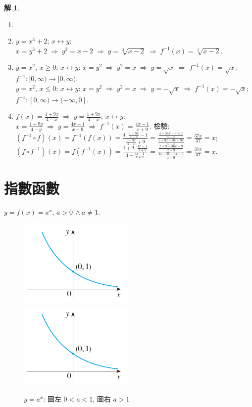 \documentclass[12pt,a4paper]{extarticle}
\newcommand{\ds}{\displaystyle}
\newcommand{\ie}{\;\Longrightarrow\;}
\theoremstyle{definition}
\newtheorem*{sol}{解}
\begin{document}
\begin{sol} 
  \begin{enumerate}\setlength\itemsep{0em}
    \item[]
    \item $y = x^3 + 2$; $x\longleftrightarrow y$: $x = y^3 + 2 \ie y^3 = x - 2 \ie y = \sqrt[3]{x - 2} \ie f^{-1}(x) = \sqrt[3]{x - 2}$.  
    \item $y = x^2$, $x\geqslant 0$;  $x\longleftrightarrow y$: $x = y^2 \ie y^2 = x \ie y = \sqrt{x} \ie f^{-1}(x) = \sqrt{x}$; $f^{-1}:[0, \infty)\to [0, \infty)$. \\$y = x^2$, $x\leqslant 0$;  $x\longleftrightarrow y$: $x = y^2 \ie y^2 = x \ie y = -\sqrt{x} \ie f^{-1}(x) = -\sqrt{x}$; $f^{-1}:[0, \infty)\to (-\infty, 0]$. 
    \item $\ds f(x) = \frac{1 + 9x}{4 - x} \ie y = \frac{1 + 9x}{4 - x}$; $x\longleftrightarrow y$: $\ds x = \frac{1 + 9 y}{4 - y} \ie y = \frac{4 x - 1}{x + 9} \ie f^{-1}(x) = \frac{4 x - 1}{x + 9}$. 檢驗: $\ds (f^{-1}\circ f)(x) = f^{-1}(f(x)) = \frac{4\cdot\frac{1 + 9x}{4 - x} - 1}{\frac{1 + 9x}{4 - x} + 9} = \frac{\frac{4 + 36 x - 4 + x}{4 - x}}{\frac{1 + 9x + 36 - 9x}{4 - x}} = \frac{37 x}{37} = x$; $\ds(f\circ f^{-1})(x) = f(f^{-1}(x)) = \frac{1 + 9\cdot\frac{4x - 1}{x + 9}}{4 - \frac{4 x - 1}{x + 9}} = \frac{\frac{x + 9 + 36 x - 9}{x + 9}}{\frac{4 x + 36 - 4x + 1}{x + 9}} = \frac{37x}{37} = x$. 
  \end{enumerate}
\end{sol}

\section*{指數函數}

$y = f(x) = a^x$, $a > 0\,\wedge a\not=1$. 

\begin{figure}[!htbp]
  \centering
  \includegraphics[scale=1.34,page=1]{fig/power.pdf}\qquad\qquad
  \includegraphics[scale=1.34,page=2]{fig/power.pdf}
  \caption{$y = a^x$: 圖左 $0 < a < 1$, 圖右 $a > 1$}
\end{figure}
\end{document}

